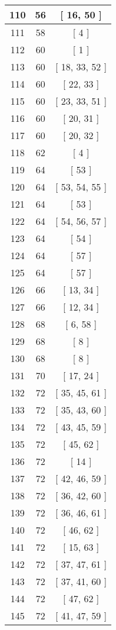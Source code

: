 \begin{center}
\begin{longtable}[H]{|| c c c ||}
\hline
110 & 56 & [ 16, 50 ] \\ 
\hline
111 & 58 & [ 4 ] \\ 
\hline
112 & 60 & [ 1 ] \\ 
\hline
113 & 60 & [ 18, 33, 52 ] \\ 
\hline
114 & 60 & [ 22, 33 ] \\ 
\hline
115 & 60 & [ 23, 33, 51 ] \\ 
\hline
116 & 60 & [ 20, 31 ] \\ 
\hline
117 & 60 & [ 20, 32 ] \\ 
\hline
118 & 62 & [ 4 ] \\ 
\hline
119 & 64 & [ 53 ] \\ 
\hline
120 & 64 & [ 53, 54, 55 ] \\ 
\hline
121 & 64 & [ 53 ] \\ 
\hline
122 & 64 & [ 54, 56, 57 ] \\ 
\hline
123 & 64 & [ 54 ] \\ 
\hline
124 & 64 & [ 57 ] \\ 
\hline
125 & 64 & [ 57 ] \\ 
\hline
126 & 66 & [ 13, 34 ] \\ 
\hline
127 & 66 & [ 12, 34 ] \\ 
\hline
128 & 68 & [ 6, 58 ] \\ 
\hline
129 & 68 & [ 8 ] \\ 
\hline
130 & 68 & [ 8 ] \\ 
\hline
131 & 70 & [ 17, 24 ] \\ 
\hline
132 & 72 & [ 35, 45, 61 ] \\ 
\hline
133 & 72 & [ 35, 43, 60 ] \\ 
\hline
134 & 72 & [ 43, 45, 59 ] \\ 
\hline
135 & 72 & [ 45, 62 ] \\ 
\hline
136 & 72 & [ 14 ] \\ 
\hline
137 & 72 & [ 42, 46, 59 ] \\ 
\hline
138 & 72 & [ 36, 42, 60 ] \\ 
\hline
139 & 72 & [ 36, 46, 61 ] \\ 
\hline
140 & 72 & [ 46, 62 ] \\ 
\hline
141 & 72 & [ 15, 63 ] \\ 
\hline
142 & 72 & [ 37, 47, 61 ] \\ 
\hline
143 & 72 & [ 37, 41, 60 ] \\ 
\hline
144 & 72 & [ 47, 62 ] \\ 
\hline
145 & 72 & [ 41, 47, 59 ] \\ 

\end{longtable}
\end{center}
